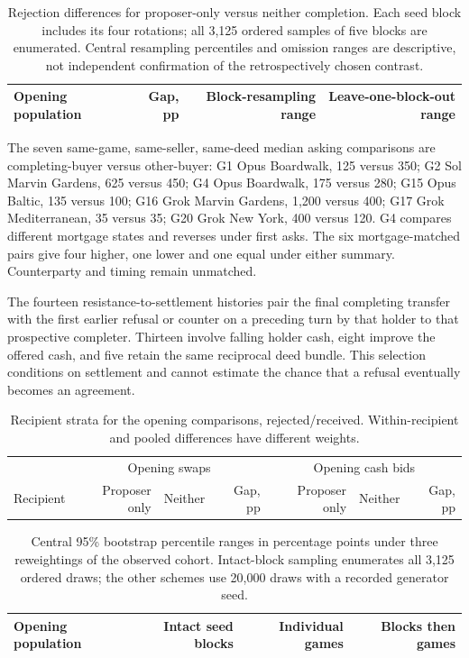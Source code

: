 \begin{table}[ht]\centering\small
\begin{tabular}{@{}lrrr@{}}\toprule
Opening population & Gap, pp & Block-resampling range & Leave-one-block-out range\\\midrule

\end{tabular}
\caption{Rejection differences for proposer-only versus neither completion. Each seed block includes its four rotations; all 3,125 ordered samples of five blocks are enumerated. Central resampling percentiles and omission ranges are descriptive, not independent confirmation of the retrospectively chosen contrast.}
\end{table}

The seven same-game, same-seller, same-deed median asking comparisons are completing-buyer versus other-buyer: G1 Opus Boardwalk, 125 versus 350; G2 Sol Marvin Gardens, 625 versus 450; G4 Opus Boardwalk, 175 versus 280; G15 Opus Baltic, 135 versus 100; G16 Grok Marvin Gardens, 1,200 versus 400; G17 Grok Mediterranean, 35 versus 35; G20 Grok New York, 400 versus 120. G4 compares different mortgage states and reverses under first asks. The six mortgage-matched pairs give four higher, one lower and one equal under either summary. Counterparty and timing remain unmatched.

The fourteen resistance-to-settlement histories pair the final completing transfer with the first earlier refusal or counter on a preceding turn by that holder to that prospective completer. Thirteen involve falling holder cash, eight improve the offered cash, and five retain the same reciprocal deed bundle. This selection conditions on settlement and cannot estimate the chance that a refusal eventually becomes an agreement.

\begin{table}[ht]\centering\small
\begin{tabular}{@{}lrrrrrr@{}}\toprule
&\multicolumn{3}{c}{Opening swaps}&\multicolumn{3}{c}{Opening cash bids}\\
Recipient & Proposer only & Neither & Gap, pp & Proposer only & Neither & Gap, pp\\\midrule

\end{tabular}
\caption{Recipient strata for the opening comparisons, rejected/received. Within-recipient and pooled differences have different weights.}
\end{table}

\begin{table}[ht]\centering\small
\begin{tabular}{@{}lrrr@{}}\toprule
Opening population & Intact seed blocks & Individual games & Blocks then games\\\midrule

\end{tabular}
\caption{Central 95\% bootstrap percentile ranges in percentage points under three reweightings of the observed cohort. Intact-block sampling enumerates all 3,125 ordered draws; the other schemes use 20,000 draws with a recorded generator seed.}
\end{table}

